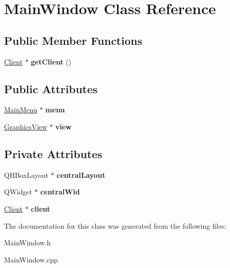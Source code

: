 \hypertarget{classMainWindow}{
\section{MainWindow Class Reference}
\label{classMainWindow}
}
\subsection*{Public Member Functions}
\begin{DoxyCompactItemize}
\item 
\hypertarget{classMainWindow_a31e0809b93d61e13581af822d0b035d4}{
\hyperlink{classClient}{Client} $\ast$ {\bfseries getClient} ()}
\label{classMainWindow_a31e0809b93d61e13581af822d0b035d4}

\end{DoxyCompactItemize}
\subsection*{Public Attributes}
\begin{DoxyCompactItemize}
\item 
\hypertarget{classMainWindow_a39182aad5faaaccb7c65f8036714c4f8}{
\hyperlink{classMainMenu}{MainMenu} $\ast$ {\bfseries menu}}
\label{classMainWindow_a39182aad5faaaccb7c65f8036714c4f8}

\item 
\hypertarget{classMainWindow_ab9ae181e7d2b99f6fff224ed064b99cc}{
\hyperlink{classGraphicsView}{GraphicsView} $\ast$ {\bfseries view}}
\label{classMainWindow_ab9ae181e7d2b99f6fff224ed064b99cc}

\end{DoxyCompactItemize}
\subsection*{Private Attributes}
\begin{DoxyCompactItemize}
\item 
\hypertarget{classMainWindow_aebbe79bb2e71537eb573bf9b13ce5cbe}{
QHBoxLayout $\ast$ {\bfseries centralLayout}}
\label{classMainWindow_aebbe79bb2e71537eb573bf9b13ce5cbe}

\item 
\hypertarget{classMainWindow_afb81d85f5c08d3c03f39b6b6a1994cf5}{
QWidget $\ast$ {\bfseries centralWid}}
\label{classMainWindow_afb81d85f5c08d3c03f39b6b6a1994cf5}

\item 
\hypertarget{classMainWindow_a5ff30e3e49a45f2b768cff8287c8cee3}{
\hyperlink{classClient}{Client} $\ast$ {\bfseries client}}
\label{classMainWindow_a5ff30e3e49a45f2b768cff8287c8cee3}

\end{DoxyCompactItemize}


The documentation for this class was generated from the following files:\begin{DoxyCompactItemize}
\item 
MainWindow.h\item 
MainWindow.cpp\end{DoxyCompactItemize}
